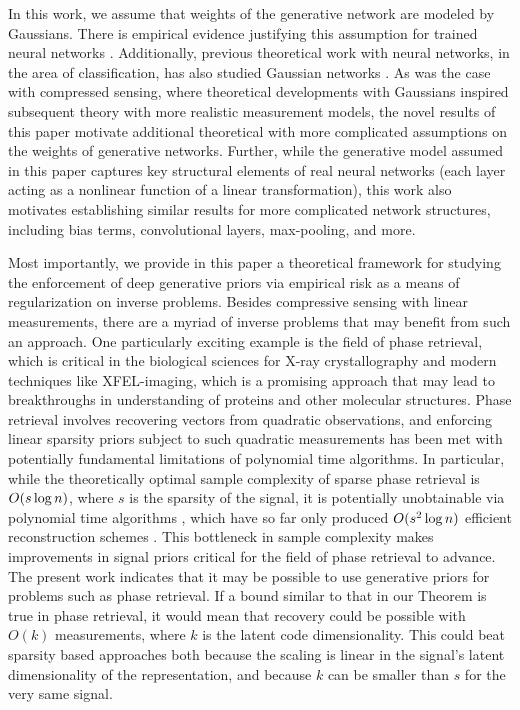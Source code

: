 \documentclass[11pt]{article}
\newcommand{\red}[1]{{\color{black} #1}}
\begin{document}

In this work, we assume that weights of the generative network are modeled by Gaussians.  There is empirical evidence justifying this assumption for trained neural networks \cite{Sanjeev}.  Additionally, previous theoretical work with neural networks, in the area of classification, has also studied Gaussian networks \cite{giryes2016deep}.  As was the case with compressed sensing, where theoretical developments with Gaussians inspired subsequent theory with more realistic measurement models, the novel results of this paper motivate additional theoretical  with more complicated assumptions on the weights of generative networks.  Further, while the generative model assumed in this paper captures key structural elements of real neural networks (each layer acting as a nonlinear function of a linear transformation), this work also motivates establishing similar results for more complicated network structures, including bias terms, convolutional layers, max-pooling, and more.  

Most importantly, we provide in this paper a theoretical framework for studying the enforcement of deep generative priors via empirical risk as a means of regularization on inverse problems. Besides compressive sensing with linear measurements, there are a myriad of inverse problems that may benefit from such an approach. One particularly exciting example is the field of phase retrieval, which is critical in the biological sciences for X-ray crystallography and modern techniques like XFEL-imaging, which is a promising approach that may lead to breakthroughs in understanding of proteins and other molecular structures. Phase retrieval involves recovering vectors from quadratic observations, and enforcing linear sparsity priors subject to such quadratic measurements has been met with potentially fundamental limitations of polynomial time algorithms. In particular, while the theoretically optimal sample complexity of sparse phase retrieval is $O(\red{s} \log n)$, \red{where $s$ is the sparsity of the signal}, it is potentially unobtainable via polynomial time algorithms \cite{barak2016nearly}, which have so far only produced $O(\red{s}^2 \log n)$ efficient reconstruction schemes \cite{li2013sparse}. This bottleneck in sample complexity makes improvements in signal priors critical for the field of phase retrieval to advance.  \red{The present work indicates that it may be possible to use generative priors for problems such as phase retrieval.  If a bound similar to that in our Theorem is true in phase retrieval, it would mean that recovery could be possible with $O(k)$ measurements, where $k$ is the latent code dimensionality.  This could beat sparsity based approaches both because the scaling is linear in the signal's latent dimensionality of the representation, and because $k$ can be smaller than $s$ for the very same signal.}
\end{document}
